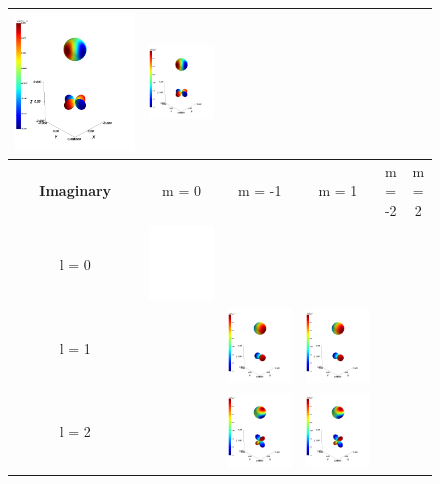 \documentclass[10pt]{article}
\begin{document}
\begin{figure}[H]
\begin{tabular}{|c|c|c|c|c|c|}
    \includegraphics[height=0.17\textwidth]{Figures/y2-2.png} &
    \includegraphics[height=0.17\textwidth]{Figures/y22.png} \\ \hline
    \hline
    \textbf{Imaginary} & m = 0 & m = -1 & m = 1 & m = -2 & m = 2 \\ \hline
    l = 0 & \includegraphics[height=0.17\textwidth]{Figures/y00_i.png} &&&& \\ \hline
    l = 1 && \includegraphics[height=0.17\textwidth]{Figures/y1-1_i.png} &
    \includegraphics[height=0.17\textwidth]{Figures/y11_i.png}  && \\ \hline
    l = 2 && \includegraphics[height=0.17\textwidth]{Figures/y2-1_i.png} &
    \includegraphics[height=0.17\textwidth]{Figures/y21_i.png} &

\end{tabular}
\end{figure}
\end{document}
